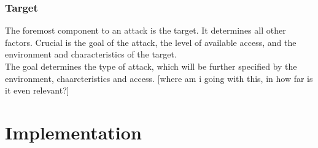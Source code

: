 \subsubsection{Target}

The foremost component to an attack is the target. It determines all other factors. Crucial is the goal of the attack, the level of available access, and the environment and characteristics of the target.\\
The goal determines the type of attack, which will be further specified by the environment, chaarcteristics and access. [where am i going with this, in how far is it even relevant?] 

\section{Implementation} \label{Implementation}

